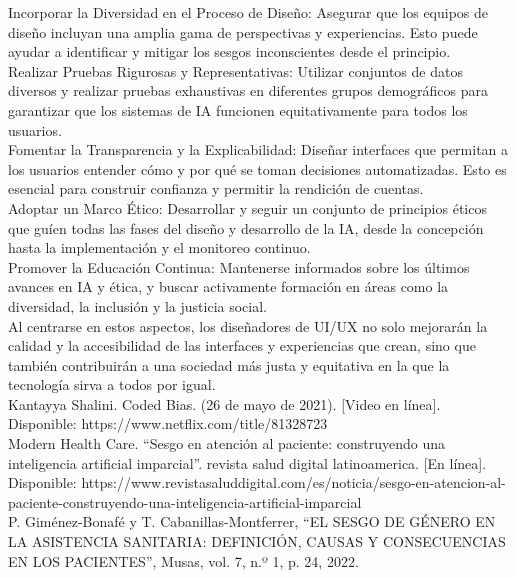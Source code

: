 \documentclass[conference]{IEEEtran}
\begin{document}
Incorporar la Diversidad en el Proceso de Diseño: Asegurar que los equipos de diseño incluyan una amplia gama de perspectivas y experiencias. Esto puede ayudar a identificar y mitigar los sesgos inconscientes desde el principio.\\
Realizar Pruebas Rigurosas y Representativas: Utilizar conjuntos de datos diversos y realizar pruebas exhaustivas en diferentes grupos demográficos para garantizar que los sistemas de IA funcionen equitativamente para todos los usuarios.\\
Fomentar la Transparencia y la Explicabilidad: Diseñar interfaces que permitan a los usuarios entender cómo y por qué se toman decisiones automatizadas. Esto es esencial para construir confianza y permitir la rendición de cuentas.\\
Adoptar un Marco Ético: Desarrollar y seguir un conjunto de principios éticos que guíen todas las fases del diseño y desarrollo de la IA, desde la concepción hasta la implementación y el monitoreo continuo.\\
Promover la Educación Continua: Mantenerse informados sobre los últimos avances en IA y ética, y buscar activamente formación en áreas como la diversidad, la inclusión y la justicia social.\\
Al centrarse en estos aspectos, los diseñadores de UI/UX no solo mejorarán la calidad y la accesibilidad de las interfaces y experiencias que crean, sino que también contribuirán a una sociedad más justa y equitativa en la que la tecnología sirva a todos por igual.\\





Kantayya Shalini. Coded Bias. (26 de mayo de 2021). [Video en línea]. Disponible: https://www.netflix.com/title/81328723\\

Modern Health Care. “Sesgo en atención al paciente: construyendo una inteligencia artificial imparcial”. revista salud digital latinoamerica. [En línea]. Disponible: https://www.revistasaluddigital.com/es/noticia/sesgo-en-atencion-al-paciente-construyendo-una-inteligencia-artificial-imparcial\\

P. Giménez-Bonafé y T. Cabanillas-Montferrer, “EL SESGO DE GÉNERO EN LA ASISTENCIA SANITARIA: DEFINICIÓN, CAUSAS Y CONSECUENCIAS EN LOS PACIENTES”, Musas, vol. 7, n.º 1, p. 24, 2022.\\
\end{document}

